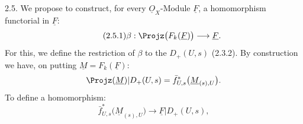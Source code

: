 2.5. We propose to construct, for every $\underline{O}_X$-Module $\underline{F}$, a homomorphism functorial in $\underline{F}$:
\begin{equation}\tag{2.5.1}
  \beta:\Projz\bigl(F_k(\underline{F})\bigr)\longrightarrow \underline{F}.
\end{equation}
For this, we define the restriction of $\beta$ to the $D_+(U,s)$ (2.3.2). By construction we have, on putting $\underline{M}=F_k(\underline{F})$:
\[
  \Projz(\underline{M})|D_+(U,s)
  =\bar f^{*}_{U,s}\bigl(\underline{M}_{(s),U}\bigr).
\]
To define a homomorphism:
\[
  \bar f^{*}_{U,s}\bigl(\underline{M}_{(s),U}\bigr)\longrightarrow \underline{F}|D_+(U,s),
\]
